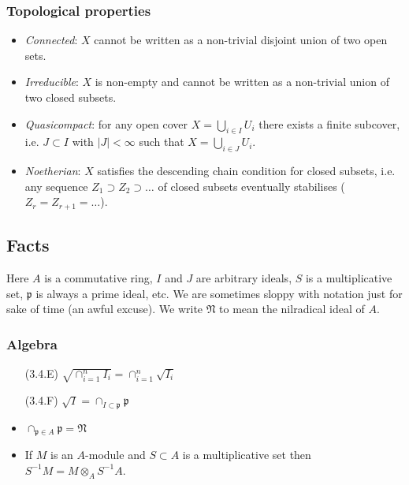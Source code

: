 \documentclass[10pt]{article}
\newcommand{\prid}{\mathfrak{p}}
\newcommand{\nilr}{\mathfrak{N}}
\begin{document}
            \subsubsection{Topological properties}
            
                \begin{itemize}
                    \item \textit{Connected}: $X$ cannot be written as a non-trivial disjoint union of two open sets.
                    \item \textit{Irreducible}: $X$ is non-empty and cannot be written as a non-trivial union of two closed subsets.
                    \item \textit{Quasicompact}: for any open cover $X=\bigcup_{i\in I}U_i$ there exists a finite subcover, i.e. $J\subset I$ with $|J|<\infty$ such that $X=\bigcup_{i\in J}U_i$.
                    \item \textit{Noetherian}: $X$ satisfies the descending chain condition for closed subsets, i.e. any sequence $Z_1\supset Z_2\supset\ldots$ of closed subsets eventually stabilises ($Z_r=Z_{r+1}=\ldots$).
                \end{itemize}
        
        \subsection{Facts}
        
            Here $A$ is a commutative ring, $I$ and $J$ are arbitrary ideals, $S$ is a multiplicative set, $\prid$ is always a prime ideal, etc.
            We are sometimes sloppy with notation just for sake of time (an awful excuse).
            We write $\nilr$ to mean the nilradical ideal of $A$.
        
            \subsubsection{Algebra}
            
                \begin{itemize}
                    \item[(3.4.E)] $\sqrt{\cap_{i=1}^n I_i}=\cap_{i=1}^n\sqrt{I_i}$
                    \item[(3.4.F)] $\sqrt{I}=\cap_{I\subset\prid}\prid$
                    \item $\cap_{\prid\in A}\prid =\nilr$
                    \item If $M$ is an $A$-module and $S\subset A$ is a multiplicative set then $S^{-1}M=M\otimes_A S^{-1}A$.
                \end{itemize}
        
\end{document}
